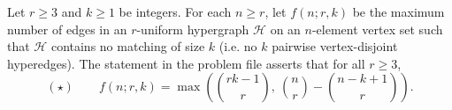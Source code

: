 Let $r\ge 3$ and $k\ge 1$ be integers.
For each $n\ge r$, let $f(n;r,k)$ be the maximum number of edges in an $r$-uniform hypergraph $\mathcal{H}$ on an $n$-element vertex set such that $\mathcal{H}$ contains no matching of size $k$ (i.e. no $k$ pairwise vertex-disjoint hyperedges).
The statement in the problem file asserts that for all $r\ge 3$,
\[
(\star)\qquad f(n;r,k)=\max\left(\binom{rk-1}{r},\ \binom{n}{r}-\binom{n-k+1}{r}\right).
\]
